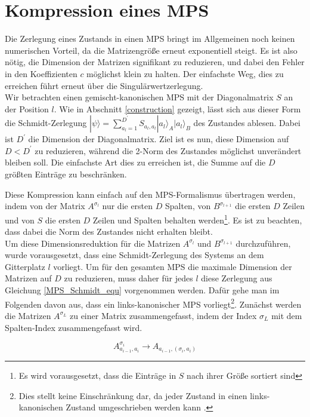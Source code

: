 \documentclass[10pt,a4paper]{report}
\begin{document}
\section{Kompression eines MPS}\label{compress}
Die Zerlegung eines Zustands in einen MPS bringt im Allgemeinen noch keinen numerischen Vorteil, da die Matrizengröße erneut exponentiell steigt. Es ist also nötig, die Dimension der Matrizen signifikant zu reduzieren, und dabei den Fehler in den Koeffizienten $c$ möglichst klein zu halten. Der einfachste Weg, dies zu erreichen führt erneut über die Singulärwertzerlegung.\\


Wir betrachten einen gemischt-kanonischen MPS mit der Diagonalmatrix $S$ an der Position $l$. Wie in Abschnitt \ref{construction} gezeigt, lässt sich aus dieser Form die Schmidt-Zerlegung $|\psi\rangle=\sum_{a_l=1}^{D^{\prime}} S_{a_l,a_l}|a_l\rangle_A|a_l\rangle_B$ des Zustandes ablesen. Dabei ist $D^\prime$ die Dimension der Diagonalmatrix. Ziel ist es nun, diese Dimension auf $D<D^\prime$ zu reduzieren, während die 2-Norm des Zustandes möglichst unverändert bleiben soll.
Die einfachste Art dies zu erreichen ist, die Summe auf die $D$ größten Einträge zu beschränken.


Diese Kompression kann einfach auf den MPS-Formalismus übertragen werden, indem von der Matrix $A^{\sigma_l}$ nur die ersten $D$ Spalten, von $B^{\sigma_{l+1}}$ die ersten $D$ Zeilen und von $S$ die ersten $D$ Zeilen und Spalten behalten werden\footnote{Es wird vorausgesetzt, dass die Einträge in $S$ nach ihrer Größe sortiert sind}. Es ist zu beachten, dass dabei die Norm des Zustandes nicht erhalten bleibt.\\

Um diese Dimensionsreduktion für die Matrizen $A^{\sigma_l}$ und $B^{\sigma_{l+1}}$ durchzuführen, wurde vorausgesetzt, dass eine Schmidt-Zerlegung des Systems an dem Gitterplatz $l$ vorliegt. Um für den gesamten MPS die maximale Dimension der Matrizen auf $D$ zu reduzieren, muss daher für jedes $l$ diese Zerlegung aus Gleichung \ref{MPS_Schmidt_equ} vorgenommen werden. Dafür gehe man im Folgenden davon aus, dass ein links-kanonischer MPS vorliegt\footnote{Dies stellt keine Einschränkung dar, da jeder Zustand in einen links-kanonischen Zustand umgeschrieben werden kann \cite[Seite~129]{MPS-main}.}. Zunächst werden die Matrizen $A^{\sigma_L}$ zu einer Matrix zusammengefasst, indem der Index $\sigma_L$ mit dem Spalten-Index zusammengefasst wird.

\begin{equation}
A_{a_{i-1},a_i}^{\sigma_i}\rightarrow A_{a_{i-1},(\sigma_i,a_i)}
\end{equation}
\end{document}
